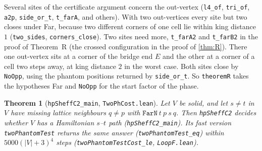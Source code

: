 \documentclass[11pt]{article}
\theoremstyle{plain}
\newtheorem{theorem}{Theorem}[section]
\theoremstyle{definition}
\theoremstyle{remark}
\newcommand{\lean}[1]{\texttt{#1}}
\begin{document}
Several sites of the certificate argument concern the out-vertex (\lean{l4\_of}, \lean{tri\_of},
\lean{a2p}, \lean{side\_or\_t}, \lean{t\_farA}, and others).
With two out-vertices every site but two closes under Far, because two different corners of one cell lie within king
distance $1$ (\lean{two\_sides}, \lean{corners\_close}).
Two sites need more, \lean{t\_farA2} and \lean{t\_farB2} in the proof of Theorem~R (the crossed
configuration in the proof of \cref{thm:R}).
There one out-vertex sits at a corner of the bridge end $E$ and the other at a corner of a cell two
steps away, at king distance $2$ in the worst case.
Both sites close by \lean{NoOpp}, using the phantom positions returned by \lean{side\_or\_t}.
So \lean{theoremR} takes the hypotheses Far and \lean{NoOpp} for the start factor of the phase.

\begin{theorem}[\lean{hpSheffC2\_main}, \lean{TwoPhCost.lean}]
\label{thm:twoph}
Let $V$ be solid, and let $s\ne t$ in $V$ have missing lattice neighbours $q\ne p$ with
$\lean{FarN}\ t\ p\ s\ q$.
Then \lean{hpSheffC2} decides whether $V$ has a Hamiltonian $s$--$t$ path
(\lean{hpSheffC2\_main}).
Its fast version \lean{twoPhantomTest} returns the same answer (\lean{twoPhantomTest\_eq}) within
$5000(|V|+3)^4$ steps (\lean{twoPhantomTestCost\_le}, \lean{LoopF.lean}).
\end{theorem}
\end{document}

